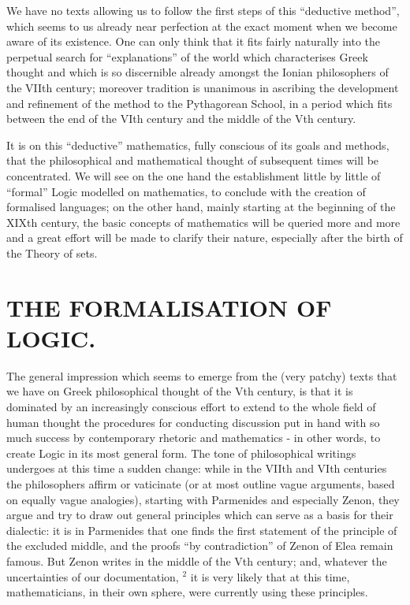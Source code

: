 We have no texts allowing us to follow the first steps of this ``deductive method'', which seems to us already near perfection at the exact moment when we become aware of its existence. One can only think that it fits fairly naturally into the perpetual search for ``explanations'' of the world which characterises Greek thought and which is so discernible already amongst the Ionian philosophers of the VIIth century; moreover tradition is unanimous in ascribing the development and refinement of the method to the Pythagorean School, in a period which fits between the end of the VIth century and the middle of the Vth century.

It is on this ``deductive'' mathematics, fully conscious of its goals and methods, that the philosophical and mathematical thought of subsequent times will be concentrated. We will see on the one hand the establishment little by little of ``formal'' Logic modelled on mathematics, to conclude with the creation of formalised languages; on the other hand, mainly starting at the beginning of the XIXth century, the basic concepts of mathematics will be queried more and more and a great effort will be made to clarify their nature, especially after the birth of the Theory of sets.

\section*{THE FORMALISATION OF LOGIC.}
{}

The general impression which seems to emerge from the (very patchy) texts that we have on Greek philosophical thought of the Vth century, is that it is dominated by an increasingly conscious effort to extend to the whole field of human thought the procedures for conducting discussion put in hand with so much success by contemporary rhetoric and mathematics - in other words, to create Logic in its most general form. The tone of philosophical writings undergoes at this time a sudden change: while in the VIIth and VIth centuries the philosophers affirm or vaticinate (or at most outline vague arguments, based on equally vague analogies), starting with Parmenides and especially Zenon, they argue and try to draw out general principles which can serve as a basis for their dialectic: it is in Parmenides that one finds the first statement of the principle of the excluded middle, and the proofs ``by contradiction'' of Zenon of Elea remain famous. But Zenon writes in the middle of the Vth century; and, whatever the uncertainties of our documentation, \(^{2}\) it is very likely that at this time, mathematicians, in their own sphere, were currently using these principles.

